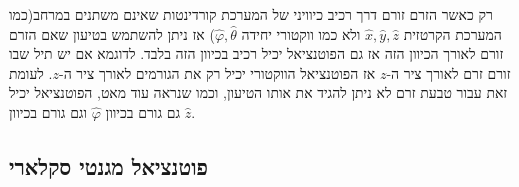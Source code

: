 \documentclass{tstextbook}
\begin{document}
\begin{remark}
רק כאשר הזרם זורם דרך רכיב כיוויני של המערכת קורדינטות שאינם משתנים במרחב(כמו המערכת הקרטזית \(\hat{x},\hat{y},\hat{z}\) ולא כמו ווקטורי יחידה \(\hat{\varphi},\hat{\theta}\))  אז ניתן להשתמש בטיעון שאם הזרם זורם לאורך הכיוון הזה אז גם הפוטנציאל יכיל רכיב בכיוון הזה בלבד.
לדוגמא אם יש תיל שבו זורם זרם לאורך ציר ה-\(z\) אז הפוטנציאל הווקטורי יכיל רק את הגורמים לאורך ציר ה-\(z\). לעומת זאת עבור טבעת זרם לא ניתן להגיד את אותו הטיעון, וכמו שנראה עוד מאט, הפוטנציאל יכיל גם גורם בכיוון \(\hat{\varphi}\) וגם גורם בכיוון \(\hat{z}\).

\end{remark}
\subsection{פוטנציאל מגנטי סקלארי}
\end{document}
